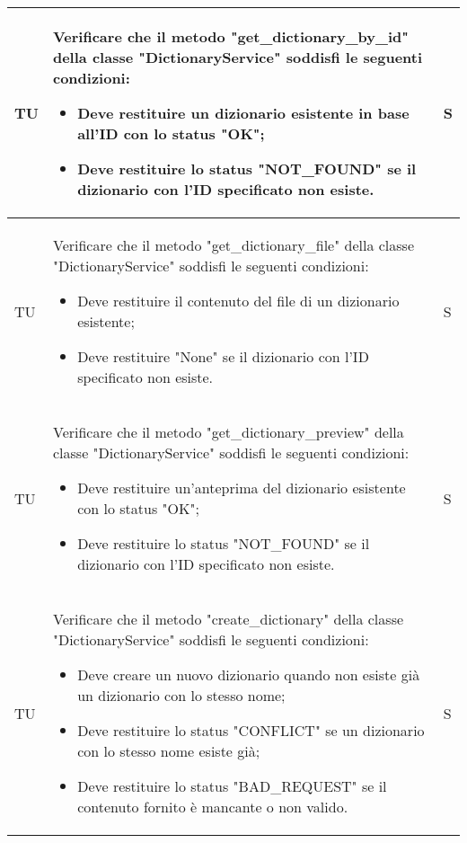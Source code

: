 \begin{adjustwidth}{-0.5cm}{-0.5cm}
\begin{longtable}{|P{1.5cm}|>{\raggedright}P{9.5cm}|>{\arraybackslash}P{1.5cm}|}
		\hline TU & Verificare che il metodo "get_dictionary_by_id" della classe "DictionaryService" soddisfi le seguenti condizioni:
		\begin{itemize}
			\item Deve restituire un dizionario esistente in base all'ID con lo status "OK";
			\item Deve restituire lo status "NOT_FOUND" se il dizionario con l'ID specificato non esiste.
		\end{itemize} & S \\

		\hline TU & Verificare che il metodo "get_dictionary_file" della classe "DictionaryService" soddisfi le seguenti condizioni:
		\begin{itemize}
			\item Deve restituire il contenuto del file di un dizionario esistente;
			\item Deve restituire "None" se il dizionario con l'ID specificato non esiste.
		\end{itemize} & S \\

		\hline TU & Verificare che il metodo "get_dictionary_preview" della classe "DictionaryService" soddisfi le seguenti condizioni:
		\begin{itemize}
			\item Deve restituire un'anteprima del dizionario esistente con lo status "OK";
			\item Deve restituire lo status "NOT_FOUND" se il dizionario con l'ID specificato non esiste.
		\end{itemize} & S \\

		\hline TU & Verificare che il metodo "create_dictionary" della classe "DictionaryService" soddisfi le seguenti condizioni:
		\begin{itemize}
			\item Deve creare un nuovo dizionario quando non esiste già un dizionario con lo stesso nome;
			\item Deve restituire lo status "CONFLICT" se un dizionario con lo stesso nome esiste già;
			\item Deve restituire lo status "BAD_REQUEST" se il contenuto fornito è mancante o non valido.
		\end{itemize} & S \\


\end{longtable}
\end{adjustwidth}
